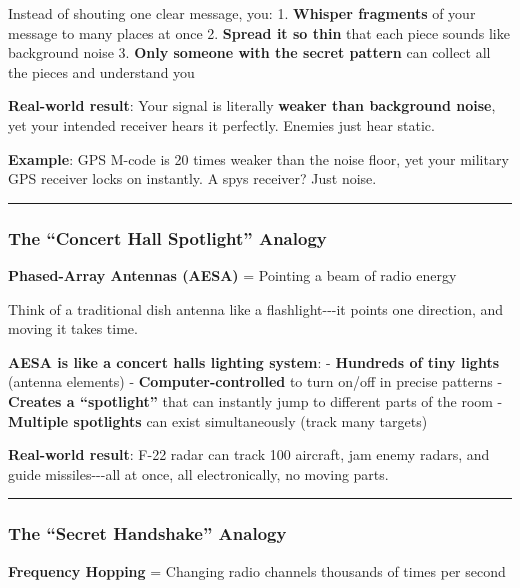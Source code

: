 Instead of shouting one clear message, you: 1. \textbf{Whisper
fragments} of your message to many places at once 2. \textbf{Spread it
so thin} that each piece sounds like background noise 3. \textbf{Only
someone with the secret pattern} can collect all the pieces and
understand you

\textbf{Real-world result}: Your signal is literally \textbf{weaker than
background noise}, yet your intended receiver hears it perfectly.
Enemies just hear static.

\textbf{Example}: GPS M-code is 20 times weaker than the noise floor,
yet your military GPS receiver locks on instantly. A
spy\textquotesingle s receiver? Just noise.

\begin{center}\rule{0.5\linewidth}{0.5pt}\end{center}

\subsubsection{The ``Concert Hall Spotlight''
Analogy}\label{the-concert-hall-spotlight-analogy}

\textbf{Phased-Array Antennas (AESA)} = Pointing a beam of radio energy

Think of a traditional dish antenna like a flashlight-\/-\/-it points
one direction, and moving it takes time.

\textbf{AESA is like a concert hall\textquotesingle s lighting system}:
- \textbf{Hundreds of tiny lights} (antenna elements) -
\textbf{Computer-controlled} to turn on/off in precise patterns -
\textbf{Creates a ``spotlight''} that can instantly jump to different
parts of the room - \textbf{Multiple spotlights} can exist
simultaneously (track many targets)

\textbf{Real-world result}: F-22 radar can track 100 aircraft, jam enemy
radars, and guide missiles-\/-\/-all at once, all electronically, no
moving parts.

\begin{center}\rule{0.5\linewidth}{0.5pt}\end{center}

\subsubsection{The ``Secret Handshake''
Analogy}\label{the-secret-handshake-analogy}

\textbf{Frequency Hopping} = Changing radio channels thousands of times
per second

